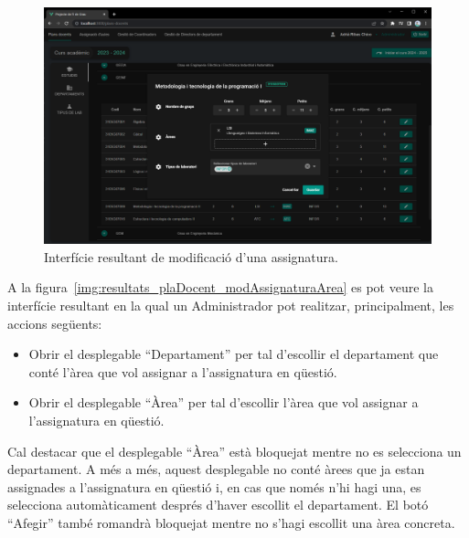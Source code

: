 \documentclass[a4paper,12pt]{ThesisStyle}
\begin{document}
\begin{figure}[H]
  \centering
  \includegraphics[width=\textwidth]{assets/results/plaDocent/modAssignatura.png}
  \caption{\label{img:resultats_plaDocent_modAssignatura}Interfície resultant de modificació d'una assignatura.}
\end{figure}

\newpage

A la figura~\ref{img:resultats_plaDocent_modAssignaturaArea} es pot veure la interfície resultant en la qual un Administrador pot realitzar, principalment, les accions següents:
\begin{itemize}
  \item Obrir el desplegable ``Departament'' per tal d'escollir el departament que conté l'àrea que vol assignar a l'assignatura en qüestió.
  \item Obrir el desplegable ``Àrea'' per tal d'escollir l'àrea que vol assignar a l'assignatura en qüestió.
\end{itemize}

Cal destacar que el desplegable ``Àrea'' està bloquejat mentre no es selecciona un departament. A més a més, aquest desplegable no conté àrees que ja estan assignades a l'assignatura en qüestió i, en cas que només n'hi hagi una, es selecciona automàticament després d'haver escollit el departament. El botó ``Afegir'' també romandrà bloquejat mentre no s'hagi escollit una àrea concreta.
\end{document}
